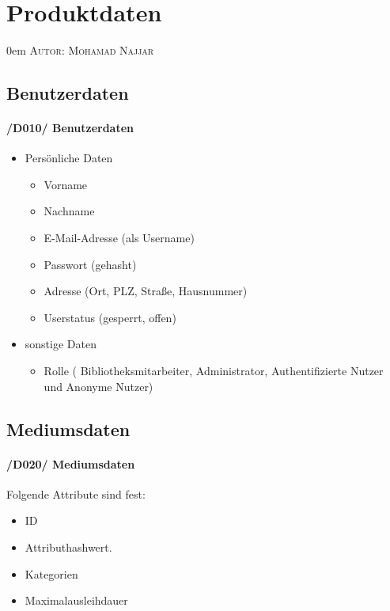 \documentclass{article}
\makeatletter
\newcommand{\sectionauthor}[1]{
	{\parindent 0em \large \scshape Autor: #1 \par \nobreak \vspace*{2em}}
	\@afterheading
}
\makeatother
\begin{document}
\section{Produktdaten} %
\sectionauthor{Mohamad Najjar}

\subsection{Benutzerdaten}
	\label{D010} \paragraph{/D010/ Benutzerdaten}
\begin{itemize}
    	\item Persönliche Daten
		\begin{itemize}
			\item Vorname
			\item Nachname
			\item E-Mail-Adresse (als Username)
			\item Passwort (gehasht)
			\item Adresse (Ort, PLZ, Straße, Hausnummer)
			\item Userstatus (gesperrt, offen)
		\end{itemize}
		
		
		\item sonstige Daten
		\begin{itemize}
		    \item Rolle ( Bibliotheksmitarbeiter, Administrator, Authentifizierte Nutzer und Anonyme Nutzer) 
		\end{itemize}
	\end{itemize}
	\subsection{Mediumsdaten}
	\label{D020} \paragraph{/D020/ Mediumsdaten}
	Folgende Attribute sind fest:
	
	\begin{itemize}
	    \item ID 
	    \item Attributhashwert.
	    \item Kategorien
	    \item Maximalausleihdauer
	    
	   	\end{itemize}
	   
\end{document}
